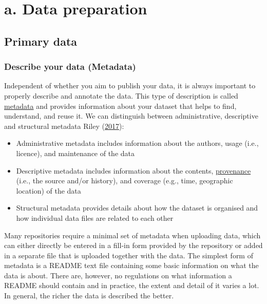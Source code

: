 \documentclass[
]{book}
\begin{document}
\hypertarget{part-a.-data-preparation}{%
\part*{a. Data preparation}\label{part-a.-data-preparation}}

\hypertarget{primary-data}{%
\chapter{Primary data}\label{primary-data}}

\hypertarget{describe-data}{%
\section{Describe your data (Metadata)}\label{describe-data}}

Independent of whether you aim to publish your data, it is always important to properly describe and annotate the data. This type of description is called \protect\hyperlink{metadata}{metadata} and provides information about your dataset that helps to find, understand, and reuse it. We can distinguish between administrative, descriptive and structural metadata Riley (\protect\hyperlink{ref-Riley_2017}{2017}):

\begin{itemize}
\item
  Administrative metadata includes information about the authors, usage (i.e., licence), and maintenance of the data
\item
  Descriptive metadata includes information about the contents, \protect\hyperlink{provenance}{provenance} (i.e., the source and/or history), and coverage (e.g., time, geographic location) of the data
\item
  Structural metadata provides details about how the dataset is organised and how individual data files are related to each other
\end{itemize}

Many repositories require a minimal set of metadata when uploading data, which can either directly be entered in a fill-in form provided by the repository or added in a separate file that is uploaded together with the data. The simplest form of metadata is a README text file containing some basic information on what the data is about. There are, however, no regulations on what information a README should contain and in practice, the extent and detail of it varies a lot. In general, the richer the data is described the better.
\end{document}
